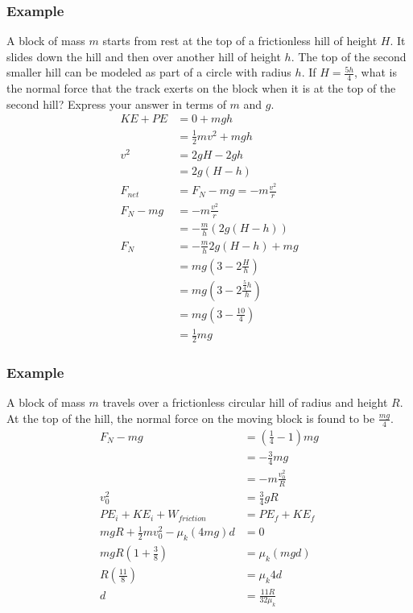 \documentclass{math}
\begin{document}
\subsubsection*{Example}
A block of mass \( m \) starts from rest at the top of a frictionless hill of
height \( H \). It slides down the hill and then over another hill of height
\( h \). The top of the second smaller hill can be modeled as part of a circle
with radius \( h \). If \( H = \frac{5h}{4} \), what is the normal force that
the track exerts on the block when it is at the top of the second hill? Express
your answer in terms of \( m \) and \( g \).
\begin{align*}
  KE+PE &= 0+mgh \\
  &= \frac{1}{2}mv^2+mgh \\
  v^2 &= 2gH-2gh \\
  &= 2g(H-h) \\
  F_{net} &= F_N-mg = -m\frac{v^2}{r} \\
  F_N-mg &= -m\frac{v^2}{r} \\
  &= -\frac{m}{h}(2g(H-h)) \\
  F_N &= -\frac{m}{h}2g(H-h)+mg \\
  &= mg(3-2\frac{H}{h}) \\
  &= mg(3-2\frac{\frac{5}{4}h}{h}) \\
  &= mg(3-\frac{10}{4}) \\
  &= \frac{1}{2}mg
\end{align*}

\subsubsection*{Example}
A block of mass \( m \) travels over a frictionless circular hill of radius and
height \( R \). At the top of the hill, the normal force on the moving block is
found to be \( \frac{mg}{4} \).
\begin{align*}
  F_N-mg &= (\frac{1}{4}-1)mg \\
  &= -\frac{3}{4}mg \\
  &= -m\frac{v_0^2}{R} \\
  v_0^2 &= \frac{3}{4}gR \\
  PE_i+KE_i+W_{friction} &= PE_f+KE_f \\
  mgR+\frac{1}{2}mv_0^2-\mu_k(4mg)d &= 0 \\
  mgR(1+\frac{3}{8}) &= \mu_k(mgd) \\
  R(\frac{11}{8}) &= \mu_k4d \\
  d &= \frac{11R}{32\mu_k}
\end{align*}
\end{document}
